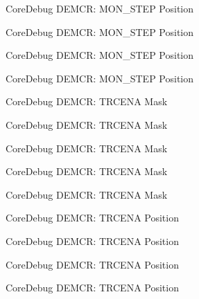 \begin{DoxyRefList}
\label{deprecated__deprecated000193}%
%
Core\+Debug D\+E\+M\+CR\+: M\+O\+N\+\_\+\+S\+T\+EP Position 

\label{deprecated__deprecated000335}%
%
Core\+Debug D\+E\+M\+CR\+: M\+O\+N\+\_\+\+S\+T\+EP Position 

\label{deprecated__deprecated000411}%
%
Core\+Debug D\+E\+M\+CR\+: M\+O\+N\+\_\+\+S\+T\+EP Position 

\label{deprecated__deprecated000500}%
%
Core\+Debug D\+E\+M\+CR\+: M\+O\+N\+\_\+\+S\+T\+EP Position  
\item[Member \mbox{\hyperlink{group__CMSIS__CoreDebug_ga5e99652c1df93b441257389f49407834}{Core\+Debug\+\_\+\+D\+E\+M\+C\+R\+\_\+\+T\+R\+C\+E\+N\+A\+\_\+\+Msk}} ]\label{deprecated__deprecated000046}%
%
Core\+Debug D\+E\+M\+CR\+: T\+R\+C\+E\+NA Mask 

\label{deprecated__deprecated000190}%
%
Core\+Debug D\+E\+M\+CR\+: T\+R\+C\+E\+NA Mask 

\label{deprecated__deprecated000332}%
%
Core\+Debug D\+E\+M\+CR\+: T\+R\+C\+E\+NA Mask 

\label{deprecated__deprecated000408}%
%
Core\+Debug D\+E\+M\+CR\+: T\+R\+C\+E\+NA Mask 

\label{deprecated__deprecated000497}%
%
Core\+Debug D\+E\+M\+CR\+: T\+R\+C\+E\+NA Mask  
\item[Member \mbox{\hyperlink{group__CMSIS__CoreDebug_ga6ff2102b98f86540224819a1b767ba39}{Core\+Debug\+\_\+\+D\+E\+M\+C\+R\+\_\+\+T\+R\+C\+E\+N\+A\+\_\+\+Pos}} ]\label{deprecated__deprecated000045}%
%
Core\+Debug D\+E\+M\+CR\+: T\+R\+C\+E\+NA Position 

\label{deprecated__deprecated000189}%
%
Core\+Debug D\+E\+M\+CR\+: T\+R\+C\+E\+NA Position 

\label{deprecated__deprecated000331}%
%
Core\+Debug D\+E\+M\+CR\+: T\+R\+C\+E\+NA Position 

\label{deprecated__deprecated000407}%
%
Core\+Debug D\+E\+M\+CR\+: T\+R\+C\+E\+NA Position 


\end{DoxyRefList}
